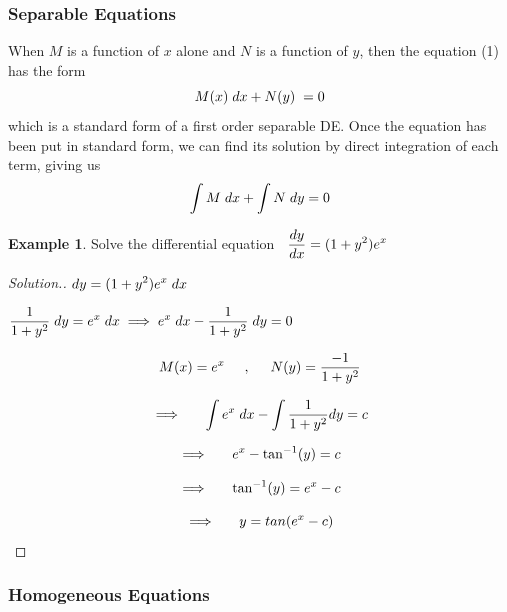 \documentclass[11pt,a4paper]{article}
\theoremstyle{definition}
\newtheorem{exa}[thm]{Example}
\newenvironment{solution}
  {\renewcommand{\qedsymbol}{}\begin{proof}[\textit{Solution}.]}
  {\end{proof}}
\begin{document}
\subsubsection{Separable Equations}

When $M$ is a function of  $x$ alone and $N$ is a function of $y$, then the equation (1) has the form $$M(x)\hspace{0.1cm}dx + N(y)\hspace{0.1cm} = 0$$
which is a standard form of a first order separable DE. Once the equation has been put in standard form, we can find its solution by direct integration of each term, giving us $$\int M\hspace{0.1cm}dx + \int N\hspace{0.1cm}dy = 0$$


\begin{exa}


Solve the differential equation $\hspace{0.2cm} \displaystyle{\dfrac{dy}{dx} = (1 + y^2 ) e^x}$
\end{exa}


\begin{solution}


$\displaystyle{dy = (1 + y^2 ) e^x\hspace{0.1cm}dx}$


$\displaystyle{\dfrac{1}{1 + y^2}\hspace{0.1cm} dy = e^x\hspace{0.1cm} dx \implies e^x\hspace{0.1cm}dx -\dfrac{1}{1 + y^2}\hspace{0.1cm}dy = 0}$

$$M(x) = e^x\hspace{0.5cm} , \hspace{0.5cm} N(y) = \frac{-1}{1 + y^2}$$

$$\implies \hspace{0.5cm} \int e^x\hspace{0.1cm} dx - \int \frac{1}{1 + y^2}dy = c$$

$$\implies \hspace{0.5cm} e^x - \tan ^{-1}(y) = c$$

$$\implies \hspace{0.5cm} \tan^{-1}(y) = e^x - c$$

$$\implies\hspace{0.5cm} y = tan (e^x - c)$$
\end{solution}


\subsubsection{Homogeneous Equations}
\end{document}
